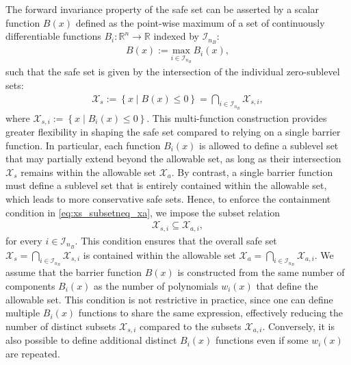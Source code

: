 \documentclass[lettersize,journal]{IEEEtran}
\newcommand{\R}{\mathbb{R}}
\newcommand{\afterReviewChangedBox}[1]{{\color{orange}#1}}
\begin{document}
The forward invariance property of the safe set can be asserted by a scalar function $B(x)$ defined as the point-wise maximum of a set of continuously differentiable functions $B_i: \R^n \to \R$ indexed by $\mathcal I_{n_{\!B}}$:
\begin{align} \label{eq:control_barrier_function}
   B(x) := \underset{i \in \mathcal I_{n_{\!B}}}{\text{max}} \, B_i(x),
\end{align}
such that the safe set is given by the intersection of the individual zero-sublevel sets:
\begin{align*}
   \mathcal X_s := \left \{ x \mid B(x) \leq 0 \right \} = \bigcap_{i \in \mathcal I_{n_{\!B}}} \mathcal X_{s,i},
\end{align*}
where $\mathcal X_{s,i} := \left \{ x \mid B_i(x) \leq 0 \right \}$.
This multi-function construction provides greater flexibility in shaping the safe set compared to relying on a single barrier function.
In particular, each function $B_i(x)$ is allowed to define a sublevel set that may partially extend beyond the allowable set, as long as their intersection $\mathcal X_s$ remains within the allowable set $\mathcal X_a$. 
By contrast, a single barrier function must define a sublevel set that is entirely contained within the allowable set, which leads to more conservative safe sets.
Hence, to enforce the containment condition in \cref{eq:xs_subsetneq_xa}, we impose the subset relation
\begin{align} \label{eq:xs_subsetneq_xa_i}
   \mathcal X_{s,i} \subseteq \mathcal X_{a,i},
\end{align}
for every $i \in \mathcal I_{n_{\!B}}$.
\afterReviewChangedBox{This condition ensures that the overall safe set $\mathcal X_s = \bigcap_{i \in \mathcal I_{n_{\!B}}} \mathcal X_{s,i}$ is contained within the allowable set $\mathcal X_a =  \bigcap_{i \in \mathcal I_{n_{\!B}}} \mathcal X_{a,i}$.
We assume that the barrier function $B(x)$ is constructed from the same number of components $B_i(x)$ as the number of polynomials $w_i(x)$ that define the allowable set.
This condition is not restrictive in practice, since one can define multiple $B_i(x)$ functions to share the same expression, effectively reducing the number of distinct subsets $\mathcal X_{s,i}$ compared to the subsets $\mathcal X_{a,i}$.
Conversely, it is also possible to define additional distinct $B_i(x)$ functions even if some $w_i(x)$ are repeated.}
\end{document}

